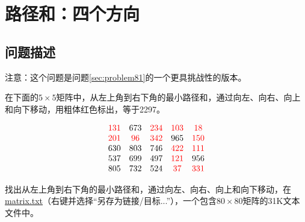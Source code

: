 \section{路径和：四个方向}\label{sec:problem83}
\subsection{问题描述}
\begin{tcolorbox}
	注意：这个问题是问题\ref{sec:problem81}的一个更具挑战性的版本。

	在下面的$5 \times 5$矩阵中，从左上角到右下角的最小路径和，通过向左、向右、向上和向下移动，用粗体红色标出，等于2297。

	\[
		\begin{array}{ccccc}
			\textcolor{red}{131} & 673      & \textcolor{red}{234} & \textcolor{red}{103} & \textcolor{red}{18}  \\
			\textcolor{red}{201} & \textcolor{red}{96} & \textcolor{red}{342} & 965       & \textcolor{red}{150} \\
			630       & 803      & 746       & \textcolor{red}{422} & \textcolor{red}{111} \\
			537       & 699      & 497       & \textcolor{red}{121} & 956       \\
			805       & 732      & 524       & \textcolor{red}{37}  & \textcolor{red}{331} \\
		\end{array}
	\]

	找出从左上角到右下角的最小路径和，通过向左、向右、向上和向下移动，在\href{https://projecteuler.net/resources/documents/0083_matrix.txt}{matrix.txt}（右键并选择“另存为链接/目标...”），一个包含$80 \times 80$矩阵的31K文本文件中。
\end{tcolorbox}


